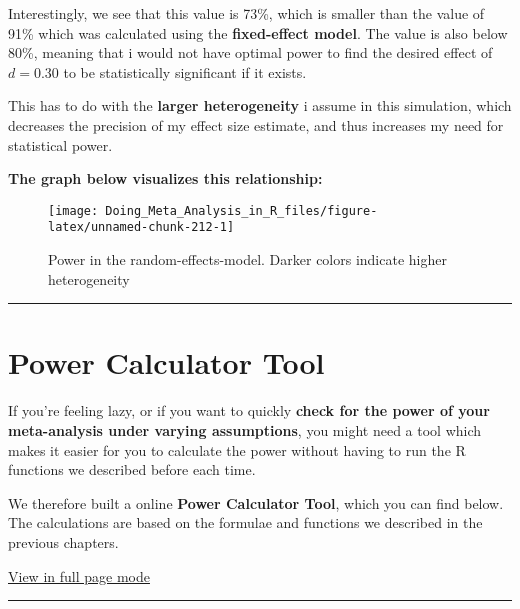 \documentclass[]{book}
\theoremstyle{definition}
\theoremstyle{definition}
\theoremstyle{definition}
\theoremstyle{remark}
\begin{document}
Interestingly, we see that this value is 73\%, which is smaller than the
value of 91\% which was calculated using the \textbf{fixed-effect
model}. The value is also below 80\%, meaning that i would not have
optimal power to find the desired effect of \(d=0.30\) to be
statistically significant if it exists.

This has to do with the \textbf{larger heterogeneity} i assume in this
simulation, which decreases the precision of my effect size estimate,
and thus increases my need for statistical power.

\textbf{The graph below visualizes this relationship:}

\begin{figure}

{\centering \texttt{[image: Doing\_Meta\_Analysis\_in\_R\_files/figure-latex/unnamed-chunk-212-1]} 

}

\caption{Power in the random-effects-model. Darker colors indicate higher heterogeneity}\label{fig:unnamed-chunk-212}
\end{figure}

\begin{center}\rule{0.5\linewidth}{\linethickness}\end{center}

\section{Power Calculator Tool}\label{power-calculator-tool}

If you're feeling lazy, or if you want to quickly \textbf{check for the
power of your meta-analysis under varying assumptions}, you might need a
tool which makes it easier for you to calculate the power without having
to run the R functions we described before each time.

We therefore built a online \textbf{Power Calculator Tool}, which you
can find below. The calculations are based on the formulae and functions
we described in the previous chapters.

\href{https://mathiasharrer.shinyapps.io/power_calculator_meta_analysis/}{View
in full page mode}

\begin{center}\rule{0.5\linewidth}{\linethickness}\end{center}


\end{document}

